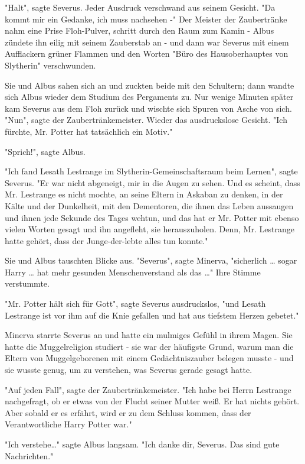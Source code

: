 {"Halt", sagte Severus. Jeder Ausdruck verschwand aus seinem Gesicht. "Da kommt mir ein Gedanke, ich muss nachsehen -" Der Meister der Zaubertränke nahm eine Prise Floh-Pulver, schritt durch den Raum zum Kamin - Albus zündete ihn eilig mit seinem Zauberstab an - und dann war Severus mit einem Aufflackern grüner Flammen und den Worten "Büro des Hausoberhauptes von Slytherin" verschwunden.

Sie und Albus sahen sich an und zuckten beide mit den Schultern; dann wandte sich Albus wieder dem Studium des Pergaments zu. Nur wenige Minuten später kam Severus aus dem Floh zurück und wischte sich Spuren von Asche von sich. "Nun", sagte der Zaubertränkemeister. Wieder das ausdruckslose Gesicht. "Ich fürchte, Mr. Potter hat tatsächlich ein Motiv."

"Sprich!", sagte Albus.

"Ich fand Lesath Lestrange im Slytherin-Gemeinschaftsraum beim Lernen", sagte Severus. "Er war nicht abgeneigt, mir in die Augen zu sehen. Und es scheint, dass Mr. Lestrange es nicht mochte, an seine Eltern in Askaban zu denken, in der Kälte und der Dunkelheit, mit den Dementoren, die ihnen das Leben aussaugen und ihnen jede Sekunde des Tages wehtun, und das hat er Mr. Potter mit ebenso vielen Worten gesagt und ihn angefleht, sie herauszuholen. Denn, Mr. Lestrange hatte gehört, dass der Junge-der-lebte alles tun konnte."

Sie und Albus tauschten Blicke aus. "Severus", sagte Minerva, "sicherlich … sogar Harry … hat mehr gesunden Menschenverstand als das …" Ihre Stimme verstummte.

"Mr. Potter hält sich für Gott", sagte Severus ausdruckslos, "und Lesath Lestrange ist vor ihm auf die Knie gefallen und hat aus tiefstem Herzen gebetet."

Minerva starrte Severus an und hatte ein mulmiges Gefühl in ihrem Magen. Sie hatte die Muggelreligion studiert - sie war der häufigste Grund, warum man die Eltern von Muggelgeborenen mit einem Gedächtniszauber belegen musste - und sie wusste genug, um zu verstehen, was Severus gerade gesagt hatte.

"Auf jeden Fall", sagte der Zaubertränkemeister. "Ich habe bei Herrn Lestrange nachgefragt, ob er etwas von der Flucht seiner Mutter weiß. Er hat nichts gehört. Aber sobald er es erfährt, wird er zu dem Schluss kommen, dass der Verantwortliche Harry Potter war."

"Ich verstehe…" sagte Albus langsam. "Ich danke dir, Severus. Das sind gute Nachrichten."

}
